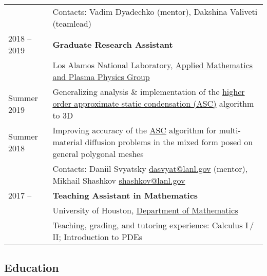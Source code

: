 \documentclass[a4paper,12pt]{article}
\begin{document}
\begin{longtable}{ l >{\raggedright\arraybackslash}p{15cm} }
			& Contacts: Vadim Dyadechko (mentor), Dakshina Valiveti (teamlead) \vspace{3mm}\\			
		2018 -- 2019
			& \textbf{Graduate Research Assistant}\vspace{1mm}\\
			& Los Alamos National Laboratory, \href{https://www.lanl.gov/org/ddste/aldsc/theoretical/applied-mathematics-plasma-physics/index.php}{Applied Mathematics and Plasma Physics Group}\vspace{1mm}\\
		Summer 2019
			& Generalizing analysis \& implementation of the \href{https://www.researchgate.net/publication/330912268_A_higher_order_approximate_static_condensation_method_for_multi-material_diffusion_problems}{higher order approximate static condensation (ASC)} algorithm to 3D\vspace{1mm}\\
		Summer 2018
			& Improving accuracy of the \href{https://www.researchgate.net/publication/318300724_Approximate_static_condensation_algorithm_for_solving_multi-material_diffusion_problems_on_meshes_non-aligned_with_material_interfaces}{ASC} algorithm for multi-material diffusion problems in the mixed form posed on general polygonal meshes\vspace{1mm}\\
			& Contacts: Daniil Svyatsky \href{mailto:dasvyat@lanl.gov}{dasvyat@lanl.gov} (mentor), Mikhail Shashkov \href{mailto:shashkov@lanl.gov}{shashkov@lanl.gov}\vspace{3mm}\\
		2017 -- 
			& \textbf{Teaching Assistant in Mathematics}\vspace{1mm}\\
			& University of Houston, \href{http://www.uh.edu/nsm/math/}{Department of Mathematics}\vspace{1mm}\\
			& Teaching, grading, and tutoring experience: Calculus I\,/\,II; Introduction to PDEs
	\end{longtable}

	\subsection*{Education}
\end{document}
